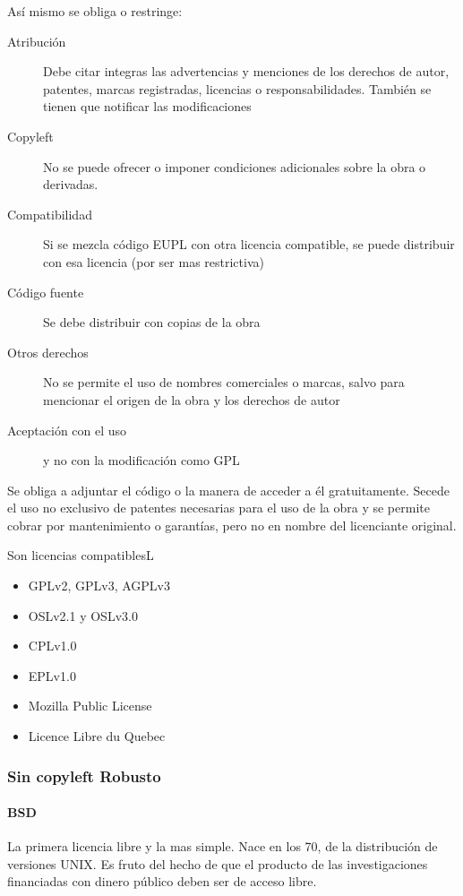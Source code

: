             Así mismo se obliga o restringe:
            \begin{description}
                \item[Atribución] Debe citar integras las advertencias y menciones de los derechos de autor, patentes, marcas registradas, licencias o responsabilidades. También se tienen que notificar las modificaciones
                \item[Copyleft] No se puede ofrecer o imponer condiciones adicionales sobre la obra o derivadas.
                \item[Compatibilidad] Si se mezcla código EUPL con otra licencia compatible, se puede distribuir con esa licencia (por ser mas restrictiva)
                \item[Código fuente] Se debe distribuir con copias de la obra
                \item[Otros derechos] No se permite el uso de nombres comerciales o marcas, salvo para mencionar el origen de la obra y los derechos de autor
                \item[Aceptación con el uso] y no con la modificación como GPL
            \end{description}

            Se obliga a adjuntar el código o la manera de acceder a él gratuitamente. Secede el uso no exclusivo de patentes necesarias para el uso de la obra y se permite cobrar por mantenimiento o garantías, pero no en nombre del licenciante original.

            Son licencias compatiblesL
            \begin{itemize}
                \item GPLv2, GPLv3, AGPLv3
                \item OSLv2.1 y OSLv3.0
                \item CPLv1.0
                \item EPLv1.0
                \item Mozilla Public License
                \item Licence Libre du Quebec
            \end{itemize}

    \subsubsection{Sin copyleft Robusto}
        \paragraph{BSD}
            La primera licencia libre y la mas simple. Nace en los 70, de la distribución de versiones UNIX. Es fruto del hecho de que el producto de las investigaciones financiadas con dinero público deben ser de acceso libre.

